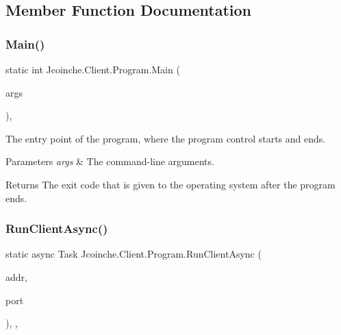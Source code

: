 \subsection{Member Function Documentation}
\mbox{\label{class_jcoinche_1_1_client_1_1_program_a91aff84e93feaac2302e7dd2f37a968d}} 
\subsubsection{\texorpdfstring{Main()}{Main()}}
{\footnotesize\ttfamily static int Jcoinche.\+Client.\+Program.\+Main (\begin{DoxyParamCaption}\item[{String \mbox{[}$\,$\mbox{]}}]{args }\end{DoxyParamCaption})\hspace{0.3cm}{\ttfamily [inline]}, {\ttfamily [static]}}



The entry point of the program, where the program control starts and ends. 


\begin{DoxyParams}{Parameters}
{\em args} & The command-\/line arguments.\\
\hline
\end{DoxyParams}
\begin{DoxyReturn}{Returns}
The exit code that is given to the operating system after the program ends.
\end{DoxyReturn}
\mbox{\label{class_jcoinche_1_1_client_1_1_program_a0c41b46b8f517f5bc87aa217f7b4cec4}} 
\subsubsection{\texorpdfstring{Run\+Client\+Async()}{RunClientAsync()}}
{\footnotesize\ttfamily static async Task Jcoinche.\+Client.\+Program.\+Run\+Client\+Async (\begin{DoxyParamCaption}\item[{I\+P\+Address}]{addr,  }\item[{short}]{port }\end{DoxyParamCaption})\hspace{0.3cm}{\ttfamily [inline]}, {\ttfamily [static]}, {\ttfamily [private]}}



